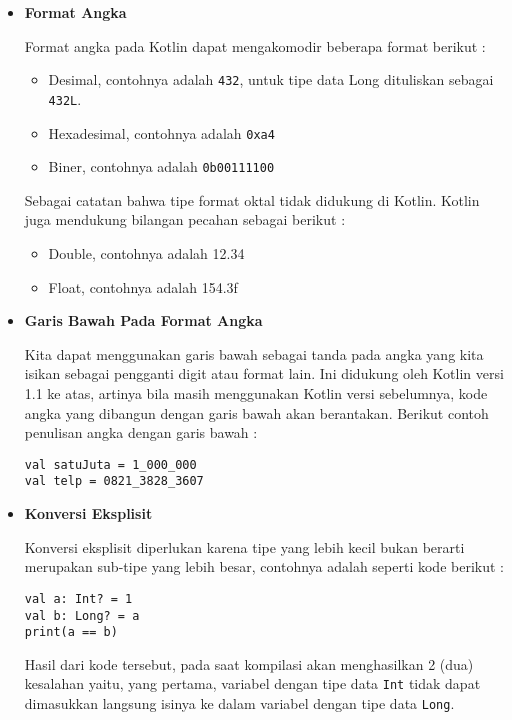\begin{itemize}
	\item \textbf{Format Angka}
	
	Format angka pada Kotlin dapat mengakomodir beberapa format berikut :
	
	\begin{itemize}
		\item Desimal, contohnya adalah \texttt{432}, untuk tipe data Long dituliskan sebagai \texttt{432L}.
		\item Hexadesimal, contohnya adalah \texttt{0xa4}
		\item Biner, contohnya adalah \texttt{0b00111100}
	\end{itemize}
	
	Sebagai catatan bahwa tipe format oktal tidak didukung di Kotlin. Kotlin juga mendukung bilangan pecahan sebagai berikut :
	
	\begin{itemize}
		\item Double, contohnya adalah 12.34
		\item Float, contohnya adalah 154.3f
	\end{itemize}
	
	\item \textbf{Garis Bawah Pada Format Angka}
	
	Kita dapat menggunakan garis bawah sebagai tanda pada angka yang kita isikan sebagai pengganti digit atau format lain. Ini didukung oleh Kotlin versi 1.1 ke atas, artinya bila masih menggunakan Kotlin versi sebelumnya, kode angka yang dibangun dengan garis bawah akan berantakan. Berikut contoh penulisan angka dengan garis bawah :
	
	\begin{lstlisting}
val satuJuta = 1_000_000
val telp = 0821_3828_3607
	\end{lstlisting}
		
	\item \textbf{Konversi Eksplisit}
	
	Konversi eksplisit diperlukan karena tipe yang lebih kecil bukan berarti merupakan sub-tipe yang lebih besar, contohnya adalah seperti kode berikut :
	
	\begin{lstlisting}
val a: Int? = 1
val b: Long? = a
print(a == b)
	\end{lstlisting}
	
	Hasil dari kode tersebut, pada saat kompilasi akan menghasilkan 2 (dua) kesalahan yaitu, yang pertama, variabel dengan tipe data \texttt{Int} tidak dapat dimasukkan langsung isinya ke dalam variabel dengan tipe data \texttt{Long}.
	

\end{itemize}
